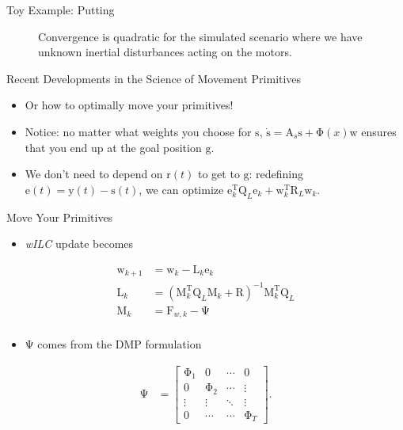 \documentclass[handout]{beamer}
\newcommand{\boldvec}[1]{\boldsymbol{\mathrm{#1}}}
\let\vec\boldvec
\newcommand{\state}{\vec{y}} %
\newcommand{\dmp}{\vec{s}} %
\newcommand{\error}{\vec{e}} %
\newcommand{\traj}{\vec{r}} %
\newcommand{\goal}{\vec{g}} %
\newcommand{\phase}{x} %
\newcommand{\weights}{\vec{w}} %
\newcommand{\basis}{\vec{\Phi}} %
\newcommand{\lmatrix}{\vec{L}} %
\newcommand{\alg}{\emph{wILC }}
\begin{document}
%
\begin{frame}{Toy Example: Putting}
\begin{figure}
\centering
\newlength\figureheight 
\newlength\figurewidth 
\setlength\figureheight{6cm}  
\setlength\figurewidth{6cm} 
\scalebox{0.8}{}
\caption{Convergence is quadratic for the simulated scenario where we have unknown inertial disturbances acting on the motors.}
\label{wILCTrajectoryPutting}
\end{figure}
\end{frame}
%
\begin{frame}{Recent Developments in the Science of Movement Primitives}
\begin{itemize}
\item Or how to optimally move your primitives!
\item Notice: no matter what weights you choose for $\dmp$, $\dot{\dmp} = \vec{A}_s \dmp + \basis(\phase) \weights$ ensures that you end up at the goal position $\goal$.
\item We don't need to depend on $\traj(t)$ to get to $\goal$: redefining $\error(t) = \state(t) - \dmp(t)$, we can optimize $\error_k^{\mathrm{T}}\vec{Q}_L\error_k + \weights_k^{\mathrm{T}}\vec{R}_L\weights_k$.
\end{itemize}
\end{frame}
%
\begin{frame}{Move Your Primitives}
\begin{itemize}
\item \alg update becomes
\end{itemize}
\begin{equation*}
\begin{aligned}
\weights_{k+1} &= \weights_{k} - \lmatrix_k\error_{k} \\
\lmatrix_k &= (\vec{M}_{k}^{\mathrm{T}}\vec{Q}_L\vec{M}_k + \vec{R})^{-1}\vec{M}_k^{\mathrm{T}}\vec{Q}_L \\
\vec{M}_k &= \vec{F}_{w,k} - \vec{\Psi} \\
\end{aligned}
\end{equation*}
\begin{itemize}
\item $\vec{\Psi}$ comes from the DMP formulation
\end{itemize}
\begin{equation*}
\begin{aligned}
\vec{\Psi} &= \begin{bmatrix}
  \vec{\Phi}_{1} & \vec{0} & \cdots & \vec{0} \\
  \vec{0} & \vec{\Phi}_{2} & \cdots & \vdots \\
  \vdots  & \vdots  & \ddots &  \vdots \\
  \vec{0} & \cdots & \cdots & \vec{\Phi}_T
 \end{bmatrix}.
\end{aligned}
\end{equation*}
\end{frame}
\end{document}
